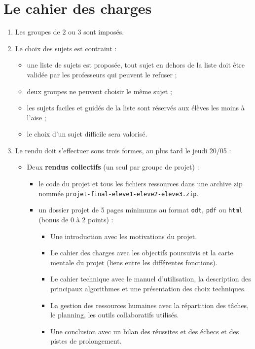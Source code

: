 \documentclass[a4paper, french, 12pt]{article}  %
\newcounter{thme}
\newcounter{prop}
\newcounter{alg}
\begin{document}
\pagestyle{fancy}





\setlength{\parindent}{0cm}


\section{Le cahier des charges}


\begin{enumerate}

\item Les groupes de $2$ ou $3$ sont imposés.

\item Le choix des sujets est contraint : 
	\begin{itemize}
	\item une liste de sujets est proposée, tout sujet en dehors de la liste doit être validée par les professeurs qui peuvent le refuser ;
	\item  deux groupes ne peuvent choisir le même sujet ;
	\item  les sujets faciles et guidés de la liste sont réservés aux élèves les moins à l'aise ;
	\item le choix d'un sujet difficile sera valorisé.
	\end{itemize}
\item Le rendu doit s'effectuer sous trois formes, au plus tard le jeudi 20/05 :
\begin{itemize}
\item Deux \textbf{rendus collectifs} (un seul par groupe de projet) :
	\begin{itemize}
		\item {} le code du projet et tous les fichiers ressources dans une archive zip nommée \texttt{projet-final-eleve1-eleve2-eleve3.zip}.
		\item  {} un dossier projet de 5 pages minimums au format \texttt{odt}, \texttt{pdf} ou \texttt{html} (bonus de 0 à  2 points)  :
			\begin{itemize}
				\item Une introduction avec les motivations du projet.
				\item Le cahier des charges avec les objectifs poursuivis et la carte mentale du projet (liens entre les différentes fonctions).
				\item Le cahier technique avec le manuel d'utilisation, la description des principaux algorithmes et une présentation des choix techniques.
				\item La gestion des ressources humaines avec la répartition des tâches, le planning, les outils collaboratifs utilisés.
				\item Une conclusion avec un bilan des réussites et des échecs et des pistes de prolongement.
			

\end{itemize}
\end{itemize}
\end{itemize}
\end{enumerate}
\end{document}

